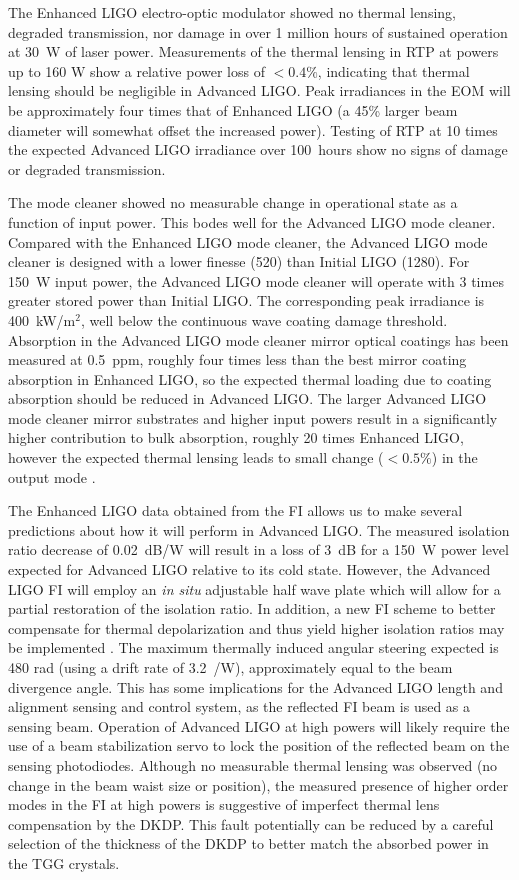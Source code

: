 The Enhanced LIGO electro-optic modulator showed no thermal lensing,
degraded transmission, nor damage in over 1 million hours of sustained
operation at 30~W of laser power. Measurements of the thermal lensing
in RTP at powers up to 160 W show a relative power loss of $< 0.4\%$,
indicating that thermal lensing should be negligible in Advanced LIGO.
Peak irradiances in the EOM will be approximately four times that of
Enhanced LIGO (a 45\% larger beam diameter will somewhat offset the
increased power).  Testing of RTP at 10 times the expected Advanced
LIGO irradiance over 100~hours show no signs of damage or degraded
transmission.

The mode cleaner showed no measurable change in operational state as a
function of input power.  This bodes well for the Advanced LIGO mode
cleaner.  Compared with the Enhanced LIGO mode cleaner, the Advanced
LIGO mode cleaner is designed with a lower finesse (520) than Initial
LIGO (1280).  For 150~W input power, the Advanced LIGO mode cleaner
will operate with 3 times greater stored power than Initial LIGO.  The
corresponding peak irradiance is 400~kW/m$^2$, well below the
continuous wave coating damage threshold.  Absorption in the Advanced
LIGO mode cleaner mirror optical coatings has been measured at
0.5~ppm, roughly four times less than the best mirror coating
absorption in Enhanced LIGO, so the expected thermal loading due to
coating absorption should be reduced in Advanced LIGO.  The larger
Advanced LIGO mode cleaner mirror substrates and higher input powers
result in a significantly higher contribution to bulk absorption,
roughly 20 times Enhanced LIGO, however the expected thermal lensing
leads to small change ($< 0.5 \%$) in the output mode
\citep{Arain2007Note}.

The Enhanced LIGO data obtained from the FI allows us to make several
predictions about how it will perform in Advanced LIGO.  The measured
isolation ratio decrease of 0.02~dB/W will result in a loss of 3~dB
for a 150~W power level expected for Advanced LIGO relative to its
cold state.  However, the Advanced LIGO FI will employ an \emph{in
  situ} adjustable half wave plate which will allow for a partial
restoration of the isolation ratio. In addition, a new FI scheme to
better compensate for thermal depolarization and thus yield higher
isolation ratios may be implemented
\cite{Snetkov2011Compensation}. The maximum thermally induced angular
steering expected is 480 \micro rad (using a drift rate of
3.2~\microrad/W), approximately equal to the beam divergence
angle. This has some implications for the Advanced LIGO length and
alignment sensing and control system, as the reflected FI beam is used
as a sensing beam. Operation of Advanced LIGO at high powers will
likely require the use of a beam stabilization servo to lock the
position of the reflected beam on the sensing photodiodes.  Although
no measurable thermal lensing was observed (no change in the beam
waist size or position), the measured presence of higher order modes
in the FI at high powers is suggestive of imperfect thermal lens
compensation by the DKDP.  This fault potentially can be reduced by a
careful selection of the thickness of the DKDP to better match the
absorbed power in the TGG crystals.

